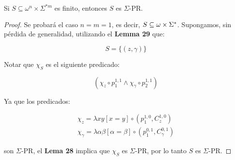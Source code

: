   \begin{corollary}
    \par Si $S \subseteq \omega^{n} \times \Sigma^{\ast m}$ es finito, entonces $S$ es $\Sigma$-PR.
  \end{corollary}
  \begin{proof}
    \par Se probará el caso $n = m = 1$, es decir, $S \subseteq \omega \times \Sigma^{\ast}$. Supongamos, sin pérdida de
    generalidad, utilizando el \textbf{Lemma 29} que:

    \[
      S = \{(z, \gamma)\}
    \]

    \par Notar que $\chi_{S}$ es el siguiente predicado:

    \[
      \left(\chi_{z} \circ p_{1}^{1,1} \wedge \chi_{\gamma} \circ p_{2}^{1,1}\right)
    \]

    \par Ya que los predicados:

    \begin{eqnarray}
      \nonumber \chi_{z} = \lambda xy \left[x = y\right] \circ \left(p_{1}^{1,0}, C_{z}^{1,0}\right) \\
      \nonumber \chi_{\gamma} = \lambda \alpha\beta \left[\alpha = \beta\right] \circ \left(p_{1}^{0,1},
      C_{\gamma}^{0,1}\right)
    \end{eqnarray}

    \par son $\Sigma$-PR, el \textbf{Lema 28} implica que $\chi_{S}$ es $\Sigma$-PR, por lo tanto $S$ es $\Sigma$-PR.
  \end{proof}

